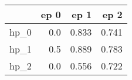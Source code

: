 \begin{tabular}{lrrr}
\toprule
{} &  ep 0 &   ep 1 &   ep 2 \\
\midrule
hp\_0 &   0.0 &  0.833 &  0.741 \\
hp\_1 &   0.5 &  0.889 &  0.783 \\
hp\_2 &   0.0 &  0.556 &  0.722 \\
\bottomrule
\end{tabular}

